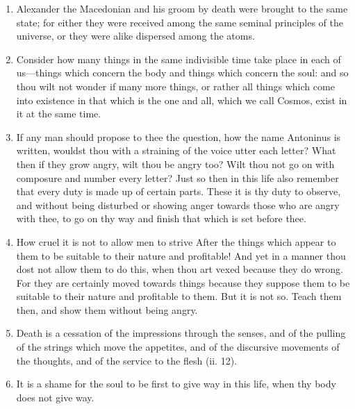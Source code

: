 \begin{enumerate}
\item Alexander the Macedonian and his groom by death were brought to the same state; for either they were received among the same seminal principles of the universe, or they were alike dispersed among the atoms.

\item Consider how many things in the same indivisible time take place in each of us—things which concern the body and things which concern the soul: and so thou wilt not wonder if many more things, or rather all things which come into existence in that which is the one and all, which we call Cosmos, exist in it at the same time.

\item If any man should propose to thee the question, how the name Antoninus is written, wouldst thou with a straining of the voice utter each letter? What then if they grow angry, wilt thou be angry too? Wilt thou not go on with composure and number every letter? Just so then in this life also remember that every duty is made up of certain parts. These it is thy duty to observe, and without being disturbed or showing anger towards those who are angry with thee, to go on thy way and finish that which is set before thee.

\item How cruel it is not to allow men to strive After the things which appear to them to be suitable to their nature and profitable! And yet in a manner thou dost not allow them to do this, when thou art vexed because they do wrong. For they are certainly moved towards things because they suppose them to be suitable to their nature and profitable to them. But it is not so. Teach them then, and show them without being angry.

\item Death is a cessation of the impressions through the senses, and of the pulling of the strings which move the appetites, and of the discursive movements of the thoughts, and of the service to the flesh (ii. 12).

\item It is a shame for the soul to be first to give way in this life, when thy body does not give way.


\end{enumerate}
